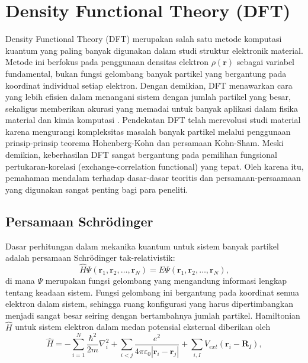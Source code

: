 \section{Density Functional Theory (DFT)}
Density Functional Theory (DFT) merupakan salah satu metode komputasi kuantum yang paling banyak digunakan dalam studi struktur elektronik material. Metode ini berfokus pada penggunaan densitas elektron \(\rho(\mathbf{r})\) sebagai variabel fundamental, bukan fungsi gelombang banyak partikel yang bergantung pada koordinat individual setiap elektron. Dengan demikian, DFT menawarkan cara yang lebih efisien dalam menangani sistem dengan jumlah partikel yang besar, sekaligus memberikan akurasi yang memadai untuk banyak aplikasi dalam fisika material dan kimia komputasi \citep{Kohn1965, Martin2004}. Pendekatan DFT telah merevolusi studi material karena mengurangi kompleksitas masalah banyak partikel melalui penggunaan prinsip-prinsip teorema Hohenberg-Kohn dan persamaan Kohn-Sham. Meski demikian, keberhasilan DFT sangat bergantung pada pemilihan fungsional pertukaran-korelasi (exchange-correlation functional) yang tepat. Oleh karena itu, pemahaman mendalam terhadap dasar-dasar teoritis dan persamaan-persaamaan yang digunakan sangat penting bagi para peneliti. \subsection{Persamaan Schrödinger}
Dasar perhitungan dalam mekanika kuantum untuk sistem banyak partikel adalah persamaan Schrödinger tak-relativistik:
\begin{equation}
    \hat{H}\Psi(\mathbf{r}_1,\mathbf{r}_2,\ldots,\mathbf{r}_N) = E\Psi(\mathbf{r}_1,\mathbf{r}_2,\ldots,\mathbf{r}_N),
\end{equation}
di mana \(\Psi\) merupakan fungsi gelombang yang mengandung informasi lengkap tentang keadaan sistem. Fungsi gelombang ini bergantung pada koordinat semua elektron dalam sistem, sehingga ruang konfigurasi yang harus dipertimbangkan menjadi sangat besar seiring dengan bertambahnya jumlah partikel. Hamiltonian \(\hat{H}\) untuk sistem elektron dalam medan potensial eksternal diberikan oleh
\begin{equation}
    \hat{H} = -\sum_{i=1}^{N}\frac{\hbar^2}{2m}\nabla_i^2 + \sum_{i<j} \frac{e^2}{4\pi\varepsilon_0|\mathbf{r}_i-\mathbf{r}_j|} + \sum_{i,I} V_{ext}(\mathbf{r}_i-\mathbf{R}_I),
\end{equation}
